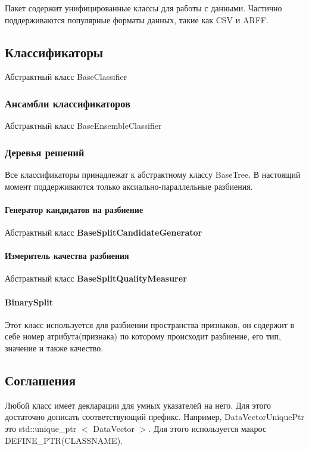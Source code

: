 Пакет содержит унифицированные классы для работы с данными. Частично поддерживаются популярные форматы данных, такие как C\-S\-V и A\-R\-F\-F.

\subsection*{Классификаторы}

Абстрактный класс Base\-Classifier

\subsubsection*{Ансамбли классификаторов}

Абстрактный класс Base\-Ensemble\-Classifier

\subsubsection*{Деревья решений}

Все классификаторы принадлежат к абстрактному классу Base\-Tree. В настоящий момент поддерживаются только аксиально-\/параллельные разбиения.

\paragraph*{Генератор кандидатов на разбиение}

Абстрактный класс {\bfseries Base\-Split\-Candidate\-Generator}

\paragraph*{Измеритель качества разбиения}

Абстрактный класс {\bfseries Base\-Split\-Quality\-Measurer}

\paragraph*{Binary\-Split}

Этот класс используется для разбиении пространства признаков, он содержит в себе номер атрибута(признака) по которому происходит разбиение, его тип, значение и также качество.

\subsection*{Соглашения}

Любой класс имеет декларации для умных указателей на него. Для этого достаточно дописать соответствующий префикс. Например, Data\-Vector\-Unique\-Ptr это std\-::unique\-\_\-ptr $<$ Data\-Vector $>$. Для этого используется макрос D\-E\-F\-I\-N\-E\-\_\-\-P\-T\-R(\-C\-L\-A\-S\-S\-N\-A\-M\-E). 